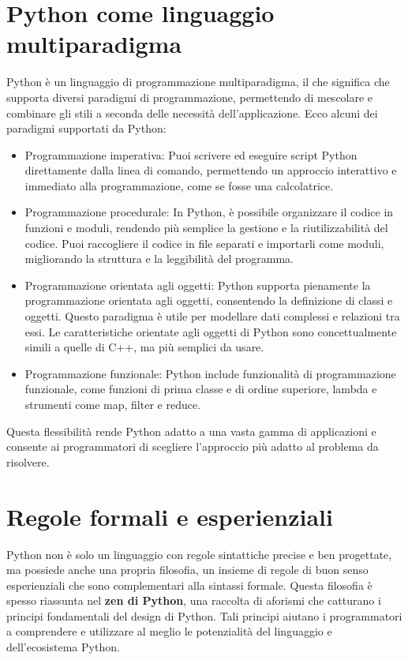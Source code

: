 \documentclass[
  letterpaper,
]{scrbook}
\providecommand{\tightlist}{%
  \setlength{\itemsep}{0pt}\setlength{\parskip}{0pt}}\usepackage{longtable,booktabs,array}
\begin{document}
\section{Python come linguaggio
multiparadigma}\label{python-come-linguaggio-multiparadigma}

Python è un linguaggio di programmazione multiparadigma, il che
significa che supporta diversi paradigmi di programmazione, permettendo
di mescolare e combinare gli stili a seconda delle necessità
dell'applicazione. Ecco alcuni dei paradigmi supportati da Python:

\begin{itemize}
\tightlist
\item
  Programmazione imperativa: Puoi scrivere ed eseguire script Python
  direttamente dalla linea di comando, permettendo un approccio
  interattivo e immediato alla programmazione, come se fosse una
  calcolatrice.
\item
  Programmazione procedurale: In Python, è possibile organizzare il
  codice in funzioni e moduli, rendendo più semplice la gestione e la
  riutilizzabilità del codice. Puoi raccogliere il codice in file
  separati e importarli come moduli, migliorando la struttura e la
  leggibilità del programma.
\item
  Programmazione orientata agli oggetti: Python supporta pienamente la
  programmazione orientata agli oggetti, consentendo la definizione di
  classi e oggetti. Questo paradigma è utile per modellare dati
  complessi e relazioni tra essi. Le caratteristiche orientate agli
  oggetti di Python sono concettualmente simili a quelle di C++, ma più
  semplici da usare.
\item
  Programmazione funzionale: Python include funzionalità di
  programmazione funzionale, come funzioni di prima classe e di ordine
  superiore, lambda e strumenti come map, filter e reduce.
\end{itemize}

Questa flessibilità rende Python adatto a una vasta gamma di
applicazioni e consente ai programmatori di scegliere l'approccio più
adatto al problema da risolvere.

\section{Regole formali e
esperienziali}\label{regole-formali-e-esperienziali}

Python non è solo un linguaggio con regole sintattiche precise e ben
progettate, ma possiede anche una propria filosofia, un insieme di
regole di buon senso esperienziali che sono complementari alla sintassi
formale. Questa filosofia è spesso riassunta nel \textbf{zen di Python},
una raccolta di aforismi che catturano i principi fondamentali del
design di Python. Tali principi aiutano i programmatori a comprendere e
utilizzare al meglio le potenzialità del linguaggio e dell'ecosistema
Python.
\end{document}
